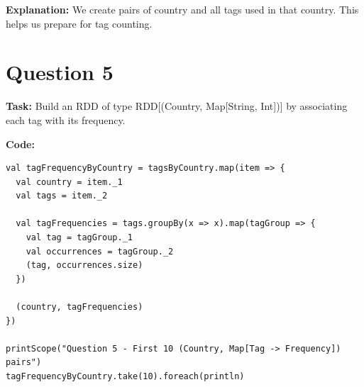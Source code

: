 \documentclass[11pt]{article}
\begin{document}
\textbf{Explanation:} We create pairs of country and all tags used in that country. This helps us prepare for tag counting.

\section*{Question 5}
\textbf{Task:} Build an RDD of type RDD[(Country, Map[String, Int])] by associating each tag with its frequency.

\textbf{Code:}
\begin{lstlisting}
val tagFrequencyByCountry = tagsByCountry.map(item => {
  val country = item._1
  val tags = item._2
  
  val tagFrequencies = tags.groupBy(x => x).map(tagGroup => {
    val tag = tagGroup._1
    val occurrences = tagGroup._2
    (tag, occurrences.size)
  })
  
  (country, tagFrequencies)
})

printScope("Question 5 - First 10 (Country, Map[Tag -> Frequency]) pairs")
tagFrequencyByCountry.take(10).foreach(println)
\end{lstlisting}
\end{document}
